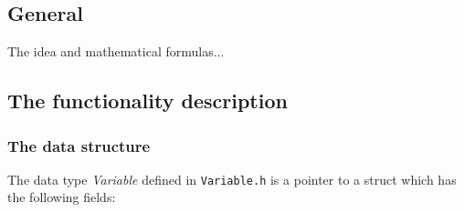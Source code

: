 \documentclass[12pt,a4paper]{report}
\newcommand{\cdatatype}[1]{{\it #1}}
\newcommand{\cfilename}[1]{\texttt{#1}}
\begin{document}
\subsection{General}

The idea and mathematical formulas...

\subsection{The functionality description}

\subsubsection{The data structure}
The data type \cdatatype{Variable} defined in \cfilename{Variable.h} 
is a pointer to a struct which has the following fields: 
\end{document}
